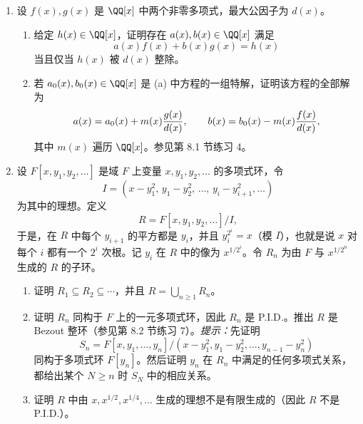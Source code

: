 \begin{enumerate}[label=\arabic*.]
	\item 设 $f(x),g(x)$ 是 $\QQ[x]$ 中两个非零多项式，最大公因子为 $d(x)$。
	\begin{enumerate}[label=(\alph*)]
		\item 给定 $h(x)\in\QQ[x]$，证明存在 $a(x),b(x)\in\QQ[x]$ 满足
		\[
		a(x)f(x)+b(x)g(x)=h(x)
		\]
		当且仅当 $h(x)$ 被 $d(x)$ 整除。
		\item 若 $a_0(x),b_0(x)\in\QQ[x]$ 是 (a) 中方程的一组特解，证明该方程的全部解为
		\[
		a(x)=a_0(x)+m(x){g(x)\over d(x)},
		\qquad
		b(x)=b_0(x)-m(x){f(x)\over d(x)},
		\]
		其中 $m(x)$ 遍历 $\QQ[x]$。参见第 8.1 节练习 4。
	\end{enumerate}
	
	\item 设 $F[x,y_1,y_2,\ldots]$ 是域 $F$ 上变量 $x,y_1,y_2,\ldots$ 的多项式环，令
	\[
	I=(x-y_1^2,\,y_1-y_2^2,\,\ldots,\,y_i-y_{i+1}^2,\ldots)
	\]
	为其中的理想。定义
	\[
	R=F[x,y_1,y_2,\ldots]/I,
	\]
	于是，在 $R$ 中每个 $y_{i+1}$ 的平方都是 $y_i$，并且 $y_i^{2^i}=x$（模 $I$），也就是说 $x$ 对每个 $i$ 都有一个 $2^i$ 次根。记 $y_i$ 在 $R$ 中的像为 $x^{1/2^i}$。令 $R_n$ 为由 $F$ 与 $x^{1/2^n}$ 生成的 $R$ 的子环。
	\begin{enumerate}[label=(\alph*)]
		\item 证明 $R_1\subseteq R_2\subseteq\cdots$，并且 $R=\bigcup_{n\geq1}R_n$。
		\item 证明 $R_n$ 同构于 $F$ 上的一元多项式环，因此 $R_n$ 是 P.I.D.。推出 $R$ 是 Bezout 整环（参见第 8.2 节练习 7）。\emph{提示：}先证明
		\[
		S_n=F[x,y_1,\ldots,y_n]/(x-y_1^2,y_1-y_2^2,\ldots,y_{n-1}-y_n^2)
		\]
		同构于多项式环 $F[y_n]$。然后证明 $y_n$ 在 $R_n$ 中满足的任何多项式关系，都给出某个 $N\geq n$ 时 $S_N$ 中的相应关系。
		\item 证明 $R$ 中由 $x,x^{1/2},x^{1/4},\ldots$ 生成的理想不是有限生成的（因此 $R$ 不是 P.I.D.）。
	\end{enumerate}
	

\end{enumerate}
